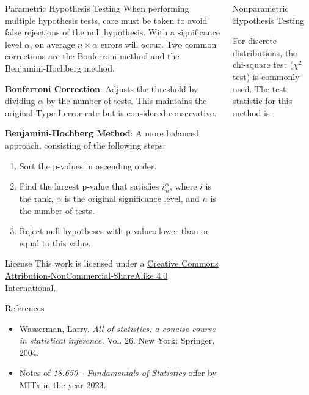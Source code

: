 \documentclass{beamer}
\begin{document}
\begin{columns}
\begin{column}{0.3\textwidth}
\begin{block}{Parametric Hypothesis Testing}
When performing multiple hypothesis tests, care must be taken to avoid false rejections of the null hypothesis. With a significance level \(\alpha\), on average \(n \times \alpha\) errors will occur. Two common corrections are the Bonferroni method and the Benjamini-Hochberg method.

\textbf{Bonferroni Correction}: Adjusts the threshold by dividing \(\alpha\) by the number of tests. This maintains the original Type I error rate but is considered conservative.

\textbf{Benjamini-Hochberg Method}: A more balanced approach, consisting of the following steps:

\begin{enumerate}
    \item Sort the p-values in ascending order.
    \item Find the largest p-value that satisfies \(i \frac{\alpha}{n}\), where \(i\) is the rank, \(\alpha\) is the original significance level, and \(n\) is the number of tests.
    \item Reject null hypotheses with p-values lower than or equal to this value.
\end{enumerate}

\end{block}

\begin{block}{License}
This work is licensed under a \href{https://creativecommons.org/licenses/by-nc-sa/4.0/}{Creative Commons Attribution-NonCommercial-ShareAlike 4.0 International}. \ccbyncsa
\end{block}

\begin{block}{References}
    \begin{itemize}
        \item Wasserman, Larry. \textit{All of statistics: a concise course in statistical inference.} Vol. 26. New York: Springer, 2004.
        \item Notes of \textit{18.650 - Fundamentals of Statistics} offer by MITx in the year 2023.
    \end{itemize}
\end{block}

\end{column}
\begin{column}{0.3\textwidth}

\begin{block}{Nonparametric Hypothesis Testing}

For discrete distributions, the chi-square test ($\chi^2$ test) is commonly used. The test statistic for this method is:


\end{block}
\end{column}
\end{columns}
\end{document}
